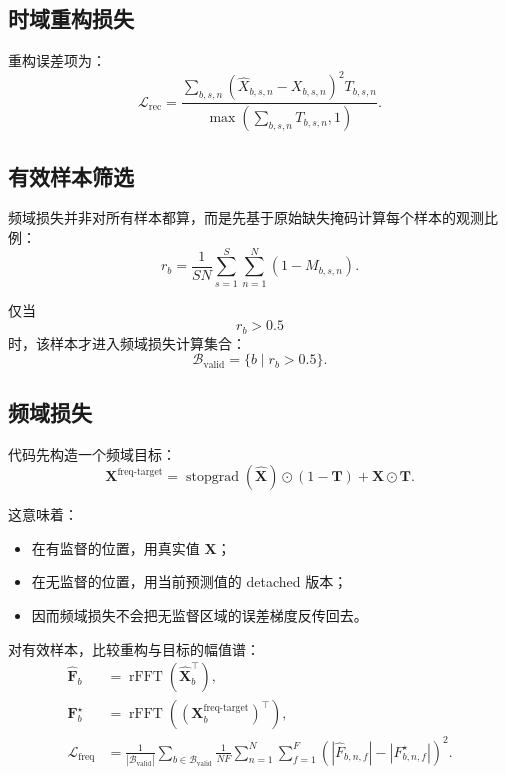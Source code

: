 \documentclass[UTF8]{ctexart}
\begin{document}
\subsection{时域重构损失}

重构误差项为：
\begin{equation}
    \mathcal{L}_{\text{rec}}
    =
    \frac{
        \sum_{b,s,n}
        \left(
            \hat{X}_{b,s,n} - X_{b,s,n}
        \right)^2
        T_{b,s,n}
    }{
        \max\!\left(\sum_{b,s,n}T_{b,s,n}, 1\right)
    }.
\end{equation}

\subsection{有效样本筛选}

频域损失并非对所有样本都算，而是先基于原始缺失掩码计算每个样本的观测比例：
\begin{equation}
    r_b = \frac{1}{SN}\sum_{s=1}^{S}\sum_{n=1}^{N}(1-M_{b,s,n}).
\end{equation}

仅当
\begin{equation}
    r_b > 0.5
\end{equation}
时，该样本才进入频域损失计算集合：
\begin{equation}
    \mathcal{B}_{\text{valid}} = \{b \mid r_b > 0.5\}.
\end{equation}

\subsection{频域损失}

代码先构造一个频域目标：
\begin{equation}
    \bm{X}^{\text{freq-target}}
    =
    \operatorname{stopgrad}(\hat{\bm{X}})\odot(1-\bm{T})
    +
    \bm{X}\odot\bm{T}.
\end{equation}

这意味着：
\begin{itemize}
    \item 在有监督的位置，用真实值 $\bm{X}$；
    \item 在无监督的位置，用当前预测值的 detached 版本；
    \item 因而频域损失不会把无监督区域的误差梯度反传回去。
\end{itemize}

对有效样本，比较重构与目标的幅值谱：
\begin{align}
    \hat{\bm{F}}_b &= \operatorname{rFFT}(\hat{\bm{X}}_b^\top), \\
    \bm{F}^{\star}_b &= \operatorname{rFFT}((\bm{X}^{\text{freq-target}}_b)^\top), \\
    \mathcal{L}_{\text{freq}}
    &=
    \frac{1}{|\mathcal{B}_{\text{valid}}|}
    \sum_{b \in \mathcal{B}_{\text{valid}}}
    \frac{1}{NF}
    \sum_{n=1}^{N}\sum_{f=1}^{F}
    \left(
        \left|\hat{F}_{b,n,f}\right|
        -
        \left|F^{\star}_{b,n,f}\right|
    \right)^2.
\end{align}
\end{document}
